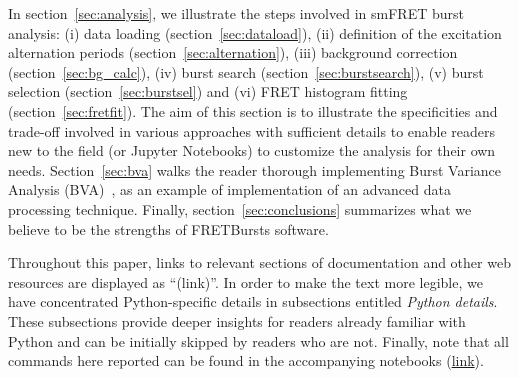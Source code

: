 In section~\ref{sec:analysis}, we illustrate the steps involved
in smFRET burst analysis: (i) data loading (section~\ref{sec:dataload}), (ii) definition of the
excitation alternation periods (section~\ref{sec:alternation}), (iii) background
correction (section~\ref{sec:bg_calc}), (iv) burst search (section~\ref{sec:burstsearch}),
(v) burst selection (section~\ref{sec:burstsel}) and (vi) FRET histogram fitting (section~\ref{sec:fretfit}).
The aim of this section is to illustrate the specificities and trade-off involved in various approaches
with sufficient details to enable readers new to the field (or Jupyter Notebooks) 
to customize the analysis for their own needs.
Section~\ref{sec:bva} walks the reader thorough implementing
Burst Variance Analysis (BVA)~\cite{Torella_2011}, as an example of implementation 
of an advanced data processing technique.
Finally, section~\ref{sec:conclusions} summarizes what we believe to be
the strengths of FRETBursts software.

Throughout this paper,
links to relevant sections of documentation and other web resources
are displayed as ``(link)''.
In order to make the text more legible,
we have concentrated Python-specific details in subsections entitled
\textit{Python details}. These subsections provide deeper insights for readers
already familiar with Python and can be initially skipped by readers who are not.
Finally, note that all commands here reported can be found in the
accompanying notebooks
(\href{https://github.com/tritemio/fretbursts_paper}{link}).
